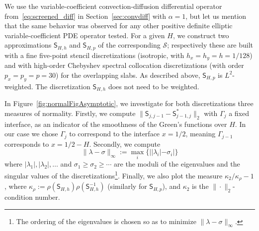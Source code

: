 \documentclass[final,onefignum,onetabnum]{siamart250211}
\newcommand{\vct}[1]{\bm{\mathsf{#1}}}
\newcommand{\mtx}[1]{\bm{\mathsf{#1}}}
\theoremstyle{definition}
\begin{document}
We use the variable-coefficient convection-diffusion differential operator from~\eqref{eq:screened_diff} in Section~\ref{sec:convdiff} with $\alpha = 1$, but let us mention that the same behavior was observed for any other positive definite elliptic variable-coefficient PDE operator tested. For a given $H$, we construct two approximations $\mtx{S}_{H,h}$ and $\mtx{S}_{H,p}$ of the corresponding $\mathcal{S}$; respectively these are built with a fine five-point stencil discretizations (isotropic, with $h_x=h_y=h=1/128$) and with high-order Chebyshev spectral collocation discretizations (with order $p_x=p_y=p=30$) for the overlapping slabs. As described above, $\mtx{S}_{H,p}$ is $L^2$-weighted. The discretization $\mtx{S}_{H,h}$ does not need to be weighted.

In Figure~\ref{fig:normalFigAsymptotic}, we investigate for both discretizations three measures of normality. Firstly, we compute $\|\mtx{S}_{j,j-1}-\mtx{S}_{j-1,j}^*\|_2$ with $\Gamma_j$ a fixed interface, as an indicator of the smoothness of the Green's functions over $H$. In our case we chose $\Gamma_{j}$ to correspond to the interface $x=1/2$, meaning $\Gamma_{j-1}$ corresponds to $x=1/2-H$. Secondly, we compute
$$\|\vct{\lambda}-\vct{\sigma}\|_{\infty}:=\max_i\{{||\lambda_i|-\sigma_i}|\}$$
where $|\lambda_1|,|\lambda_2|,\ldots$ and $\sigma_1\geq \sigma_2\geq \cdots$ are the moduli of the eigenvalues and the singular values of the discretizations\footnote{The ordering of the eigenvalues is chosen so as to minimize $\|\vct{\lambda}-\vct{\sigma}\|_{\infty}$.}. Finally, we also plot the measure $\kappa_2/\kappa_{\rho}-1$, where $\kappa_{\rho}:=\rho(\mtx{S}_{H,h})\rho(\mtx{S}_{H,h}^{-1})$ (similarly for $\mtx{S}_{H,p}$), and $\kappa_2$ is the $\|\cdot\|_2$-condition number.
\end{document}
